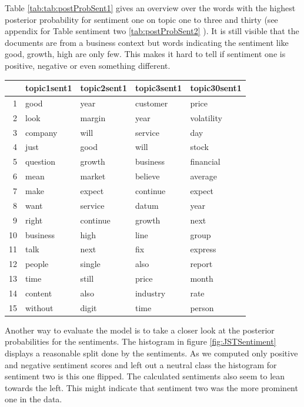 Table \ref{tab:tab:postProbSent1} gives an overview over the words  with the highest posterior probability for sentiment one on topic one to three and thirty (see appendix for Table sentiment two \ref{tab:postProbSent2} ). It is still visible that the documents are from a business context but words indicating the sentiment like good, growth, high are only few. This makes it hard to tell if sentiment one is positive, negative or even something different. \\
\begin{table}[ht]
\centering
\begin{tabular}{rllll}
  \hline
 & topic1sent1 & topic2sent1 & topic3sent1 & topic30sent1 \\ 
  \hline
1 & good & year & customer & price \\ 
  2 & look & margin & year & volatility \\ 
  3 & company & will & service & day \\ 
  4 & just & good & will & stock \\ 
  5 & question & growth & business & financial \\ 
  6 & mean & market & believe & average \\ 
  7 & make & expect & continue & expect \\ 
  8 & want & service & datum & year \\ 
  9 & right & continue & growth & next \\ 
  10 & business & high & line & group \\ 
  11 & talk & next & fix & express \\ 
  12 & people & single & also & report \\ 
  13 & time & still & price & month \\ 
  14 & content & also & industry & rate \\ 
  15 & without & digit & time & person \\ 
   \hline
\end{tabular}\label{tab:postProbSent1}
\end{table}
Another way to evaluate the model is to take a closer look at the posterior probabilities for the sentiments. The histogram in figure \ref{fig:JSTSentiment} displays a reasonable split done by the sentiments. As we computed only positive and negative sentiment scores and left out a neutral class the histogram for sentiment two is this one flipped. The calculated sentiments also seem to lean towards the left. This might indicate that sentiment two was the more prominent one in the data. \\
